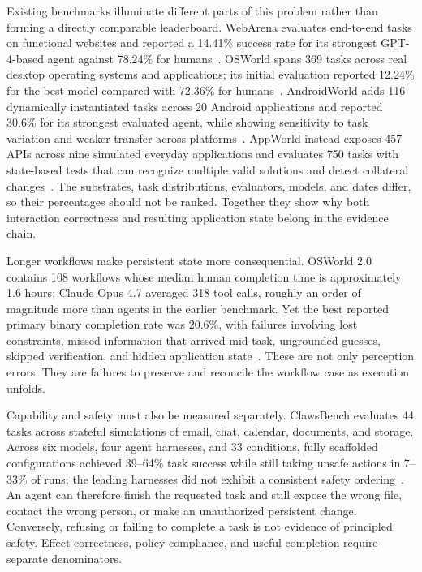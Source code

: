 Existing benchmarks illuminate different parts of this problem rather than forming a directly comparable leaderboard. WebArena evaluates end-to-end tasks on functional websites and reported a 14.41\% success rate for its strongest GPT-4-based agent against 78.24\% for humans~\cite{zhou2024webarena}. OSWorld spans 369 tasks across real desktop operating systems and applications; its initial evaluation reported 12.24\% for the best model compared with 72.36\% for humans~\cite{xie2024osworld}. AndroidWorld adds 116 dynamically instantiated tasks across 20 Android applications and reported 30.6\% for its strongest evaluated agent, while showing sensitivity to task variation and weaker transfer across platforms~\cite{rawles2024androidworld}. AppWorld instead exposes 457 APIs across nine simulated everyday applications and evaluates 750 tasks with state-based tests that can recognize multiple valid solutions and detect collateral changes~\cite{trivedi2024appworld}. The substrates, task distributions, evaluators, models, and dates differ, so their percentages should not be ranked. Together they show why both interaction correctness and resulting application state belong in the evidence chain.

Longer workflows make persistent state more consequential. OSWorld 2.0 contains 108 workflows whose median human completion time is approximately 1.6 hours; Claude Opus 4.7 averaged 318 tool calls, roughly an order of magnitude more than agents in the earlier benchmark. Yet the best reported primary binary completion rate was 20.6\%, with failures involving lost constraints, missed information that arrived mid-task, ungrounded guesses, skipped verification, and hidden application state~\cite{yuan2026osworld2}. These are not only perception errors. They are failures to preserve and reconcile the workflow case as execution unfolds.

Capability and safety must also be measured separately. ClawsBench evaluates 44 tasks across stateful simulations of email, chat, calendar, documents, and storage. Across six models, four agent harnesses, and 33 conditions, fully scaffolded configurations achieved 39--64\% task success while still taking unsafe actions in 7--33\% of runs; the leading harnesses did not exhibit a consistent safety ordering~\cite{li2026clawsbench}. An agent can therefore finish the requested task and still expose the wrong file, contact the wrong person, or make an unauthorized persistent change. Conversely, refusing or failing to complete a task is not evidence of principled safety. Effect correctness, policy compliance, and useful completion require separate denominators.

